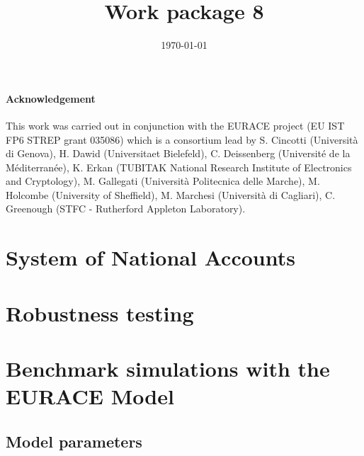 \documentclass[a4paper,11pt]{book}
\begin{document}
\title{Work package 8}
\author{}
\date{\today}
\maketitle
\tableofcontents

\subsubsection*{Acknowledgement}
This work was carried out in conjunction with the EURACE project (EU IST FP6
STREP grant 035086) which is a consortium lead by S. Cincotti (Universit\`{a} di
Genova), H. Dawid (Universitaet Bielefeld), C. Deissenberg (Universit\'{e} de la
M\'{e}diterran\'{e}e), K. Erkan (TUBITAK National Research Institute of Electronics
and Cryptology), M. Gallegati  (Universit\`{a} Politecnica delle Marche), M.
Holcombe (University of Sheffield), M. Marchesi (Universit\`{a} di Cagliari), C.
Greenough (STFC - Rutherford Appleton Laboratory).


\chapter{System of National Accounts}



\chapter{Robustness testing}
%

\chapter{Benchmark simulations with the EURACE Model}


\begin{appendix}
\chapter{Model parameters}

\end{appendix}

%
%
\end{document}
